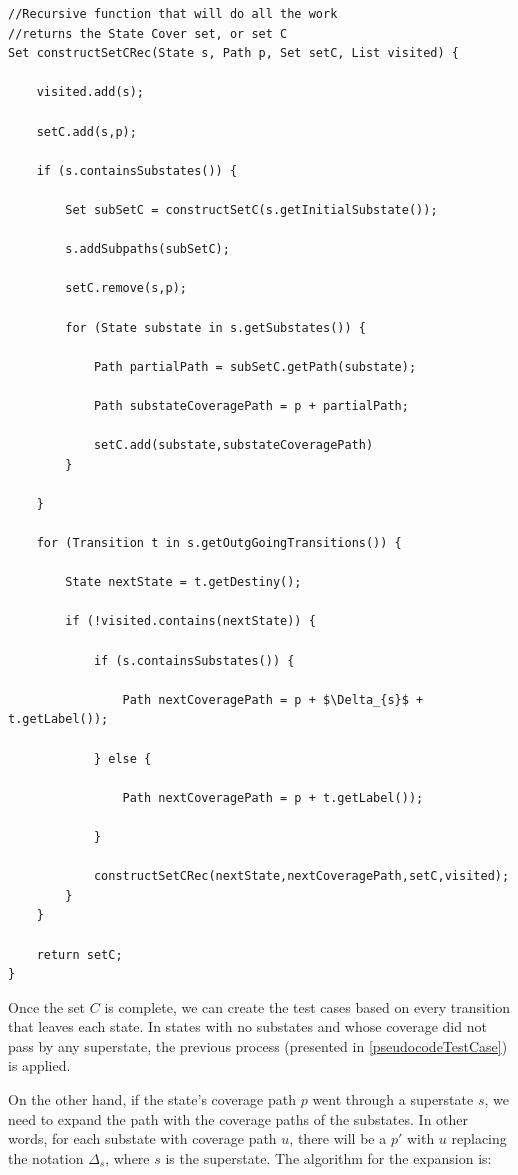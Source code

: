 \begin{lstlisting}[mathescape,caption={Recursive State Cover construction for statecharts with hierarchy}]
//Recursive function that will do all the work
//returns the State Cover set, or set C
Set constructSetCRec(State s, Path p, Set setC, List visited) {

	visited.add(s);

	setC.add(s,p);

	if (s.containsSubstates()) {

		Set subSetC = constructSetC(s.getInitialSubstate());	

		s.addSubpaths(subSetC);

		setC.remove(s,p);

		for (State substate in s.getSubstates()) {

			Path partialPath = subSetC.getPath(substate);

			Path substateCoveragePath = p + partialPath;

			setC.add(substate,substateCoveragePath)	
		}
		
	}
	
	for (Transition t in s.getOutgGoingTransitions()) {
		
		State nextState = t.getDestiny();

		if (!visited.contains(nextState)) {

			if (s.containsSubstates()) {
			
				Path nextCoveragePath = p + $\Delta_{s}$ + t.getLabel());

			} else {

				Path nextCoveragePath = p + t.getLabel());

			}	

			constructSetCRec(nextState,nextCoveragePath,setC,visited);	
		}
	}
	
	return setC;
}

\end{lstlisting}
 

Once the set $C$ is complete, we can create the test cases based on every transition that leaves each state. In states with no substates and whose coverage did not pass by any superstate, the previous process (presented in \ref{pseudocodeTestCase}) is applied.

On the other hand, if the state's coverage path $p$ went through a superstate $s$, we need to expand the path with the coverage paths of the substates. In other words, for each substate with coverage path $u$,  there will be a $p'$ with $u$ replacing the notation $\Delta_s$, where $s$ is the superstate. The algorithm for the expansion is:

